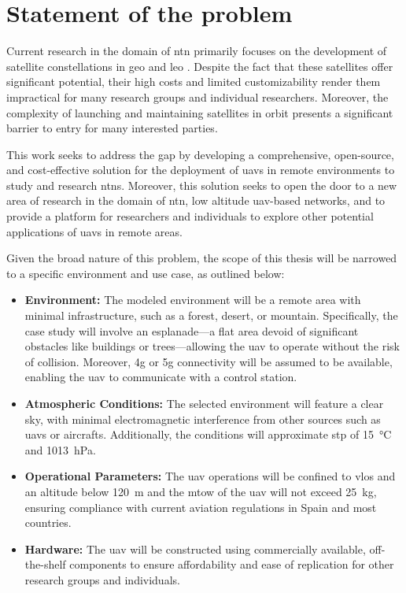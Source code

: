 
\chapter{Statement of the problem}\label{ch:statement_of_problem}

Current research in the domain of \gls{ntn} primarily focuses on the development of satellite constellations in \gls{geo} and \gls{leo} \autocite{non_terrestial_networks_trends}. Despite the fact that these satellites offer significant potential, their high costs and limited customizability render them impractical for many research groups and individual researchers. Moreover, the complexity of launching and maintaining satellites in orbit presents a significant barrier to entry for many interested parties.

This work seeks to address the gap by developing a comprehensive, open-source, and cost-effective solution for the deployment of \glspl{uav} in remote environments to study and research \glspl{ntn}. Moreover, this solution seeks to open the door to a new area of research in the domain of \gls{ntn}, low altitude \gls{uav}-based networks, and to provide a platform for researchers and individuals to explore other potential applications of \glspl{uav} in remote areas.

Given the broad nature of this problem, the scope of this thesis will be narrowed to a specific environment and use case, as outlined below:

\begin{itemize}
  \item \textbf{Environment:} The modeled environment will be a remote area with minimal infrastructure, such as a forest, desert, or mountain. Specifically, the case study will involve an esplanade—a flat area devoid of significant obstacles like buildings or trees—allowing the \gls{uav} to operate without the risk of collision. Moreover, \gls{4g} or \gls{5g} connectivity will be assumed to be available, enabling the \gls{uav} to communicate with a control station.

  \item \textbf{Atmospheric Conditions:} The selected environment will feature a clear sky, with minimal electromagnetic interference from other sources such as \glspl{uav} or aircrafts. Additionally, the conditions will approximate \gls{stp} of \SI{15}{\degreeCelsius} and \SI{1013}{\hecto\pascal}.

  \item \textbf{Operational Parameters:} The \gls{uav} operations will be confined to \gls{vlos} and an altitude below \SI{120}{\metre} and the \gls{mtow} of the \gls{uav} will not exceed \SI{25}{\kilogram}, ensuring compliance with current aviation regulations in Spain and most countries.

  \item \textbf{Hardware:} The \gls{uav} will be constructed using commercially available, off-the-shelf components to ensure affordability and ease of replication for other research groups and individuals.
\end{itemize}
